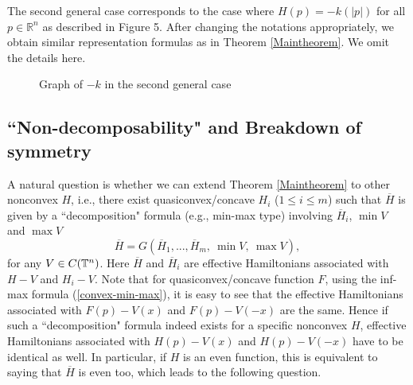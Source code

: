 \documentclass[12pt,reqno]{amsart}
\theoremstyle{plain}
\theoremstyle{remark}
\numberwithin{equation}{section}
\newcommand{\R}{\mathbb{R}}
\newcommand{\ol}{\overline}
\begin{document}
The second general case corresponds to the case where  $H(p)=-k(|p|)$ for all $p \in \R^n$ as described in Figure 5.
After changing the notations appropriately, we obtain similar representation formulas as in Theorem \ref{Maintheorem}.
We omit the details here.
\begin{figure}[h]
\begin{center}

\caption{Graph of $-k$ in the second general case}
\label{fig5}
\end{center}
\end{figure}


\subsection{ ``Non-decomposability" and  Breakdown of symmetry}\label{subsec:even}

A natural question is whether we can extend Theorem \ref{Maintheorem} to other  nonconvex $H$,   i.e.,  there exist quasiconvex/concave $H_i$  ($1\leq i\leq m$) such that $\ol H$ is given by a ``decomposition" formula (e.g., min-max type)  involving $\ol H_i$, $\min V$ and $\max V$
\begin{equation}\label{uni-decom}
\ol H=G(\ol H_1,..., \ol H_m, \ \min V, \ \max V),
\end{equation}
 for any $V\in C(\Bbb T^n)$.  Here $\ol H$ and $\ol H_i$ are effective Hamiltonians associated with $H-V$ and $H_i-V$.  Note that for quasiconvex/concave function $F$,   using the inf-max formula (\ref{convex-min-max}),  it is easy to see that the effective Hamiltonians associated with $F(p)-V(x)$ and $F(p)-V(-x)$ are the same.   Hence if such a ``decomposition"  formula indeed exists for a specific nonconvex $H$,   effective Hamiltonians associated with $H(p)-V(x)$ and $H(p)-V(-x)$ have to be identical as well.  In particular,  if $H$ is an even function,  this is equivalent to saying that $\ol H$ is even too, which leads to the following  question. 
\end{document}
